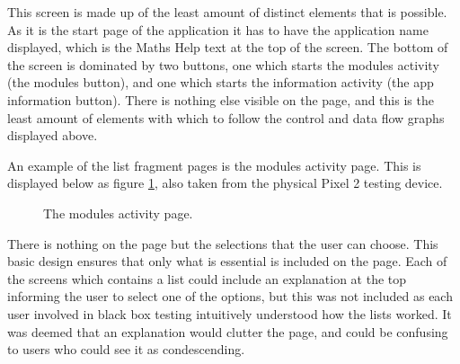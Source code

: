 \documentclass{article}
\begin{document}
This screen is made up of the least amount of distinct elements that is possible. As it is the start page of the application it has to have the application name displayed, which is the Maths Help text at the top of the screen. The bottom of the screen is dominated by two buttons, one which starts the modules activity (the modules button), and one which starts the information activity (the app information button). There is nothing else visible on the page, and this is the least amount of elements with which to follow the control and data flow graphs displayed above. \par

An example of the list fragment pages is the modules activity page. This is displayed below as figure \ref{figure:applicationModulesPage}, also taken from the physical Pixel 2 testing device. 

\begin{figure}[H]
	\centering
	\caption{The modules activity page.}
	\label{figure:applicationModulesPage}
\end{figure}

There is nothing on the page but the selections that the user can choose. This basic design ensures that only what is essential is included on the page. Each of the screens which contains a list could include an explanation at the top informing the user to select one of the options, but this was not included as each user involved in black box testing intuitively understood how the lists worked. It was deemed that an explanation would clutter the page, and could be confusing to users who could see it as condescending. \par
\end{document}
